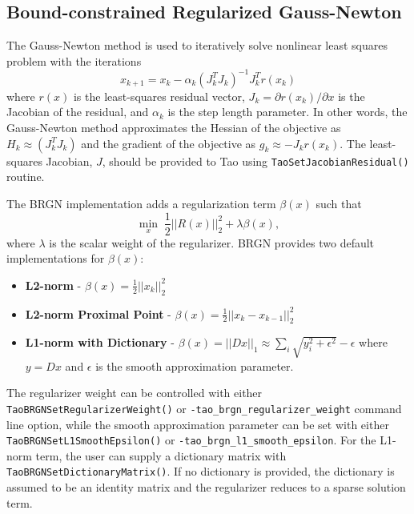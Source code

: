 \documentclass[]{book}
\begin{document}
\subsection{Bound-constrained Regularized Gauss-Newton}

The Gauss-Newton method is used to iteratively solve nonlinear least squares problem with the 
iterations
\begin{equation}
x_{k+1} = x_k - \alpha_k(J_k^T J_k)^{-1} J_k^T r(x_k)
\end{equation}
where $r(x)$ is the least-squares residual vector, $J_k = \partial r(x_k)/\partial x$ is 
the Jacobian of the residual, and $\alpha_k$ is the step length parameter. In other words,
the Gauss-Newton method approximates the Hessian of the objective as $H_k \approx (J_k^T J_k)$ 
and the gradient of the objective as $g_k \approx -J_k r(x_k)$. The least-squares Jacobian, $J$, 
should be provided to Tao using {\tt TaoSetJacobianResidual()} routine.

The BRGN implementation adds a regularization term $\beta(x)$ such that
\begin{equation}
\min_{x} \; \frac{1}{2}||R(x)||_2^2 + \lambda\beta(x),
\end{equation}
where $\lambda$ is the scalar weight of the regularizer. BRGN provides two default implementations 
for $\beta(x)$:
\begin{itemize}
  \item \textbf{L2-norm} - $\beta(x) = \frac{1}{2}||x_k||_2^2$
  \item \textbf{L2-norm Proximal Point} - $\beta(x) = \frac{1}{2}||x_k - x_{k-1}||_2^2$
  \item \textbf{L1-norm with Dictionary} - $\beta(x) = ||Dx||_1 \approx \sum_{i} \sqrt{y_i^2 + \epsilon^2}-\epsilon$ 
        where $y = Dx$ and $\epsilon$ is the smooth approximation parameter.
\end{itemize}
The regularizer weight can be controlled with either {\tt TaoBRGNSetRegularizerWeight()} or 
{\tt -tao\_brgn\_regularizer\_weight} command line option, while the smooth approximation parameter can be set 
with either {\tt TaoBRGNSetL1SmoothEpsilon()} or {\tt -tao\_brgn\_l1\_smooth\_epsilon}. For the L1-norm term, 
the user can supply a dictionary matrix with {\tt TaoBRGNSetDictionaryMatrix()}. If no dictionary 
is provided, the dictionary is assumed to be an identity matrix and the regularizer reduces to a 
sparse solution term.
\end{document}
